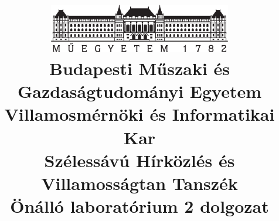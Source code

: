 
\documentclass[a4paper,12pt,titlepage]{article}
\usepackage{ucs}
\usepackage[T1]{fontenc}
\usepackage[utf8]{inputenc}
\usepackage[magyar]{babel}
\usepackage{amsfonts}
\usepackage{amsmath}
\usepackage{graphicx}
\usepackage[left=20mm,right=20mm,top=20mm,bottom=25mm]{geometry}
\usepackage{hyperref}
\usepackage{cite}
\usepackage{xcolor}

\pagestyle{plain} 

\listfiles %

\title{
    \centering
    \includegraphics[width=0.6\textwidth]{kep/bme_logo.pdf} \\
    \vspace{0.5cm}
    \large{\textbf{Budapesti Műszaki és Gazdaságtudományi Egyetem}\\
    \textbf{Villamosmérnöki és Informatikai Kar}\\
    \textbf{Szélessávú Hírközlés és Villamosságtan Tanszék}}\\
    \vspace{5cm}
    \huge{\textbf{Önálló laboratórium 2 dolgozat}} \\
    \vspace{3cm}
}



